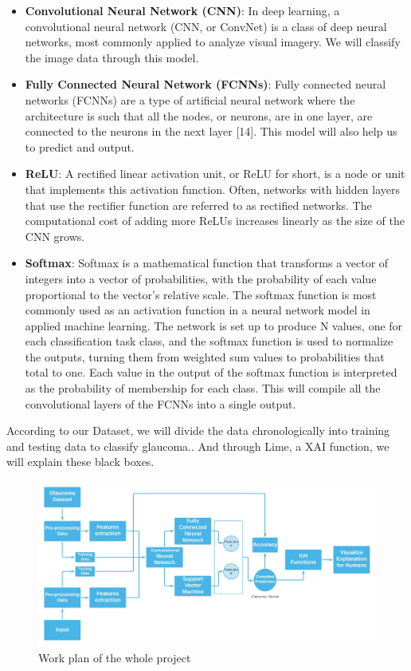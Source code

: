\documentclass[conference]{IEEEtran}
\begin{document}
\begin{itemize}
  \item \textbf{Convolutional Neural Network (CNN)}: In deep learning, a convolutional neural network (CNN, or ConvNet) is a class of deep neural networks, most commonly applied to analyze visual imagery. We will classify the image data through this model.

  \item \textbf{Fully Connected Neural Network (FCNNs)}: Fully connected neural networks (FCNNs) are a type of artificial neural network where the architecture is such that all the nodes, or neurons, are in one layer, are connected to the neurons in the next layer [14]. This model will also help us to predict and output.

  \item \textbf{ReLU}: A rectified linear activation unit, or ReLU for short, is a node or unit that implements this activation function. Often, networks with hidden layers that use the rectifier function are referred to as rectified networks. The computational cost of adding more ReLUs increases linearly as the size of the CNN grows.

  \item \textbf{Softmax}: Softmax is a mathematical function that transforms a vector of integers into a vector of probabilities, with the probability of each value proportional to the vector's relative scale. The softmax function is most commonly used as an activation function in a neural network model in applied machine learning. The network is set up to produce N values, one for each classification task class, and the softmax function is used to normalize the outputs, turning them from weighted sum values to probabilities that total to one. Each value in the output of the softmax function is interpreted as the probability of membership for each class. This will compile all the convolutional layers of the FCNNs into a single output.
\end{itemize}

\noindent According to our Dataset, we will divide the data chronologically into training and testing data to classify glaucoma.. And through Lime, a XAI function, we will explain these black boxes.

\begin{figure}[hbt!]
\centerline{\includegraphics[scale=0.5]{fig-3.png}}
\caption{Work plan of the whole project}
\label{fig}
\end{figure}
\end{document}
